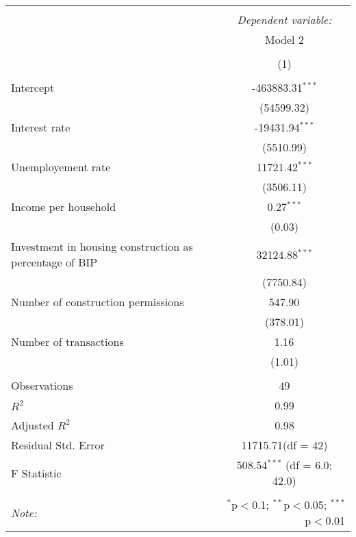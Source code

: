 \begin{table}[!htbp] \centering
\begin{tabular}{@{\extracolsep{5pt}}lc}
\\[-1.8ex]\hline
\hline \\[-1.8ex]
& \multicolumn{1}{c}{\textit{Dependent variable:}} \
\cr \cline{1-2}
\\[-1.8ex] & \multicolumn{1}{c}{Model 2} \\\\[-1.8ex] & (1) \\
\hline \\[-1.8ex]
 Intercept & -463883.31$^{***}$ \\
  & (54599.32) \\
 Interest rate & -19431.94$^{***}$ \\
  & (5510.99) \\
 Unemployement rate & 11721.42$^{***}$ \\
  & (3506.11) \\
 Income per household & 0.27$^{***}$ \\
  & (0.03) \\
 Investment in housing construction as percentage of BIP & 32124.88$^{***}$ \\
  & (7750.84) \\
 Number of construction permissions & 547.90$^{}$ \\
  & (378.01) \\
 Number of transactions & 1.16$^{}$ \\
  & (1.01) \\
\hline \\[-1.8ex]
 Observations & 49 \\
 $R^2$ & 0.99 \\
 Adjusted $R^2$ & 0.98 \\
 Residual Std. Error & 11715.71(df = 42)  \\
 F Statistic & 508.54$^{***}$ (df = 6.0; 42.0) \\
\hline
\hline \\[-1.8ex]
\textit{Note:} & \multicolumn{1}{r}{$^{*}$p$<$0.1; $^{**}$p$<$0.05; $^{***}$p$<$0.01} \\
\end{tabular}
\end{table}